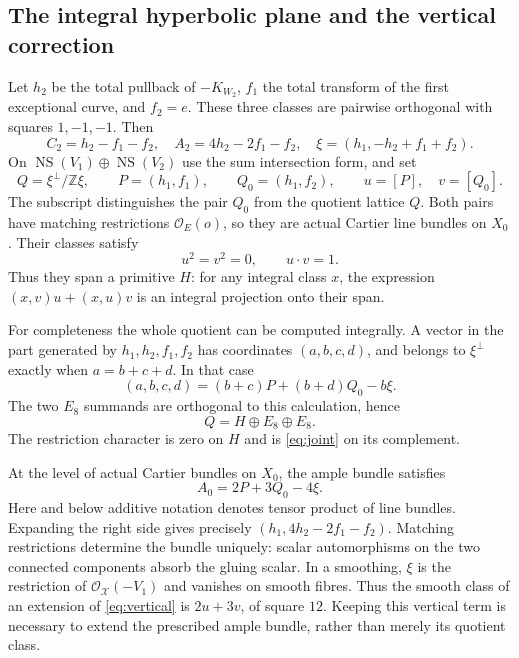 \documentclass[11pt]{article}
\theoremstyle{definition}
\theoremstyle{remark}
\newcommand{\Z}{\mathbb Z}
\newcommand{\NS}{\operatorname{NS}}
\newcommand{\OO}{\mathcal O}
\begin{document}
\subsection{The integral hyperbolic plane and the vertical correction}
Let $h_2$ be the total pullback of $-K_{W_2}$, $f_1$ the total transform of the first exceptional curve, and $f_2=e$. These three classes are pairwise orthogonal with squares $1,-1,-1$. Then
\[
C_2=h_2-f_1-f_2,\quad A_2=4h_2-2f_1-f_2,\quad
\xi=(h_1,-h_2+f_1+f_2).
\]
On $\NS(V_1)\oplus\NS(V_2)$ use the sum intersection form, and set
\begin{equation}\label{eq:Q}
Q=\xi^\perp/\Z\xi,\qquad
P=(h_1,f_1),\qquad Q_0=(h_1,f_2),\qquad
u=[P],\quad v=[Q_0].
\end{equation}
The subscript distinguishes the pair $Q_0$ from the quotient lattice $Q$. Both pairs have matching restrictions $\OO_E(o)$, so they are actual Cartier line bundles on $X_0$. Their classes satisfy
\[
u^2=v^2=0,\qquad u\cdot v=1.
\]
Thus they span a primitive $H$: for any integral class $x$, the expression $(x,v)u+(x,u)v$ is an integral projection onto their span.


For completeness the whole quotient can be computed integrally. A vector in the part generated by $h_1,h_2,f_1,f_2$ has coordinates $(a,b,c,d)$, and belongs to $\xi^\perp$ exactly when $a=b+c+d$. In that case
\begin{equation}\label{eq:integral-splitting}
(a,b,c,d)=(b+c)P+(b+d)Q_0-b\xi.
\end{equation}
The two $E_8$ summands are orthogonal to this calculation, hence
\begin{equation}\label{eq:boundary-lattice}
Q=H\oplus E_8\oplus E_8.
\end{equation}
The restriction character is zero on $H$ and is \eqref{eq:joint} on its complement.

At the level of actual Cartier bundles on $X_0$, the ample bundle satisfies
\begin{equation}\label{eq:vertical}
A_0=2P+3Q_0-4\xi.
\end{equation}
Here and below additive notation denotes tensor product of line bundles. Expanding the right side gives precisely $(h_1,4h_2-2f_1-f_2)$. Matching restrictions determine the bundle uniquely: scalar automorphisms on the two connected components absorb the gluing scalar. In a smoothing, $\xi$ is the restriction of $\OO_{\mathcal X}(-V_1)$ and vanishes on smooth fibres. Thus the smooth class of an extension of \eqref{eq:vertical} is $2u+3v$, of square $12$. Keeping this vertical term is necessary to extend the prescribed ample bundle, rather than merely its quotient class.
\end{document}
